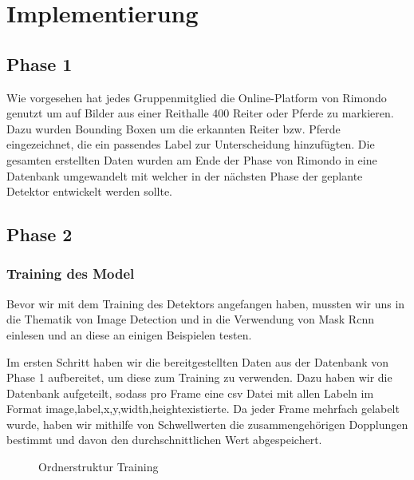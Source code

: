\chapter{Implementierung}
\label{ch:implementierung}

\section{Phase 1}
Wie vorgesehen hat jedes Gruppenmitglied die Online-Platform von Rimondo genutzt um auf Bilder aus einer Reithalle 400 Reiter oder Pferde zu markieren. Dazu wurden Bounding Boxen um  die erkannten Reiter bzw. Pferde eingezeichnet, die ein passendes Label zur Unterscheidung hinzufügten. Die gesamten erstellten Daten wurden am Ende der Phase von Rimondo in eine Datenbank umgewandelt mit welcher in der nächsten Phase der geplante Detektor entwickelt werden sollte.

\section{Phase 2}
\subsection*{Training des Model}
Bevor wir mit dem Training des Detektors angefangen haben, mussten wir uns in die Thematik von Image Detection und in die Verwendung von Mask Rcnn einlesen und an diese an einigen Beispielen testen. 



Im ersten Schritt haben wir die bereitgestellten Daten aus der Datenbank von Phase 1 aufbereitet, um diese zum Training zu verwenden. Dazu haben wir die Datenbank aufgeteilt, sodass pro Frame eine csv Datei mit allen Labeln im Format \dq image,label,x,y,width,height\dq existierte. Da jeder Frame mehrfach gelabelt wurde, haben wir mithilfe von Schwellwerten die zusammengehörigen Dopplungen bestimmt und davon den durchschnittlichen Wert abgespeichert. 

\begin{figure}
\caption{Ordnerstruktur Training}
\label{fig:folderstructure}
\end{figure}

